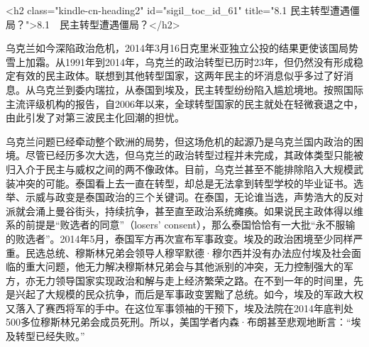 




<h2 class="kindle-cn-heading2" id="sigil_toc_id_61" title="8.1 民主转型遭遇僵局？">8.1　民主转型遭遇僵局？</h2>

乌克兰如今深陷政治危机，2014年3月16日克里米亚独立公投的结果更使该国局势雪上加霜。从1991年到2014年，乌克兰的政治转型已历时23年，但仍然没有形成稳定有效的民主政体。联想到其他转型国家，这两年民主的坏消息似乎多过了好消息。从乌克兰到委内瑞拉，从泰国到埃及，民主转型纷纷陷入尴尬境地。按照国际主流评级机构的报告，自2006年以来，全球转型国家的民主就处在轻微衰退之中，由此引发了对第三波民主化回潮的担忧。

乌克兰问题已经牵动整个欧洲的局势，但这场危机的起源乃是乌克兰国内政治的困境。尽管已经历多次大选，但乌克兰的政治转型过程并未完成，其政体类型只能被归入介于民主与威权之间的两不像政体。目前，乌克兰甚至不能排除陷入大规模武装冲突的可能。泰国看上去一直在转型，却总是无法拿到转型学校的毕业证书。选举、示威与政变是泰国政治的三个关键词。在泰国，无论谁当选，声势浩大的反对派就会涌上曼谷街头，持续抗争，甚至直至政治系统瘫痪。如果说民主政体得以维系的前提是“败选者的同意”（losers' consent），那么泰国恰恰有一大批“永不服输的败选者”。2014年5月，泰国军方再次宣布军事政变。埃及的政治困境至少同样严重。民选总统、穆斯林兄弟会领导人穆罕默德·穆尔西并没有办法应付埃及社会面临的重大问题，他无力解决穆斯林兄弟会与其他派别的冲突，无力控制强大的军方，亦无力领导国家实现政治和解与走上经济繁荣之路。在不到一年的时间里，先是兴起了大规模的民众抗争，而后是军事政变罢黜了总统。如今，埃及的军政大权又落入了赛西将军的手中。在这位军事领袖的干预下，埃及法院在2014年底判处500多位穆斯林兄弟会成员死刑。所以，美国学者内森·布朗甚至悲观地断言：“埃及转型已经失败。”

